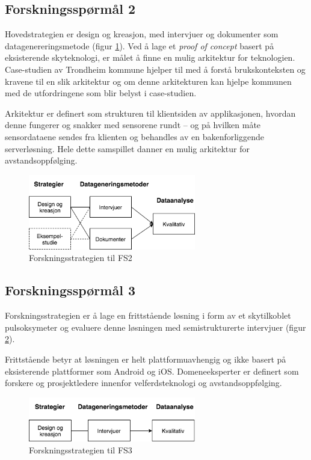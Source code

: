 \subsection{Forskningsspørmål 2}
\textbf{}

Hovedstrategien er design og kreasjon, med intervjuer og dokumenter som datagenereringsmetode (figur \ref{fig:oates_fs2}). Ved å lage
et \textit{proof of concept} basert på eksisterende skyteknologi, er målet å finne en mulig arkitektur for teknologien. Case-studien av Trondheim
kommune hjelper til med å forstå brukskonteksten og kravene til en slik arkitektur og om denne arkitekturen kan hjelpe kommunen med de
utfordringene som blir belyst i case-studien.

Arkitektur er definert
som strukturen til klientsiden av applikasjonen, hvordan denne fungerer og snakker med sensorene rundt -- og på hvilken måte sensordataene sendes
fra klienten og behandles av en bakenforliggende serverløsning. Hele dette samspillet danner en mulig arkitektur for avstandsoppfølging.

\begin{figure}
\centering
\includegraphics[width=0.65\textwidth]{fig/oates/fs2}
\caption{Forskningsstrategien til FS2}
\label{fig:oates_fs2}
\end{figure}
    
\subsection{Forskningsspørmål 3}
\textbf{}

Forskningsstrategien er å lage en frittstående løsning i form av et skytilkoblet pulsoksymeter og evaluere
denne løsningen med semistrukturerte intervjuer (figur \ref{fig:oates_fs3}).
 
Frittstående betyr at løsningen er helt plattformuavhengig og ikke basert på eksisterende plattformer som Android og iOS.
Domeneeksperter er definert som forskere og prosjektledere innenfor velferdsteknologi og avstandsoppfølging.

\begin{figure}
\centering
\includegraphics[width=0.65\textwidth]{fig/oates/fs3}
\caption{Forskningsstrategien til FS3}
\label{fig:oates_fs3}
\end{figure}

